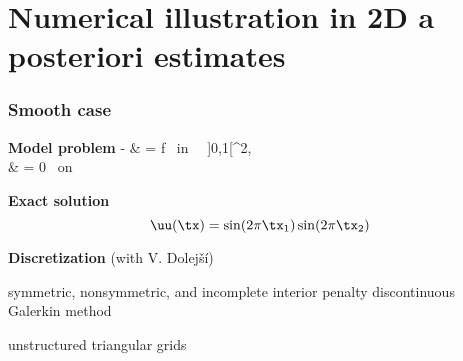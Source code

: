 \documentclass[compress]{beamer}
\newcommand{\cblue}[1]{{\color{blue}{#1}}}
\begin{document}
\section[Numerics]{Numerical illustration in 2D a posteriori estimates}

\begin{frame}
\frametitle{Smooth case}

{\bf Model problem}
%
\ban
    \ds - \Lap \uu & =  f \quad \mbox{ in } \, \Om \eq ]0,1[^2,\\
    \ds \uu & = 0 \quad \mbox{ on } \, \pt \Om
\ean

\pause

{\bf Exact solution}
%
\[
    \uu(\tx) = \sin(2 \pi \tx_1) \sin(2 \pi \tx_2)
\]

\pause

{\bf Discretization} (with V. Dolej\v s\'i)

\bi

\item symmetric, nonsymmetric, and incomplete interior penalty discontinuous
Galerkin method

\item unstructured triangular grids

\item \cblue{uniform refinement}

\ei

\end{frame}
\end{document}

